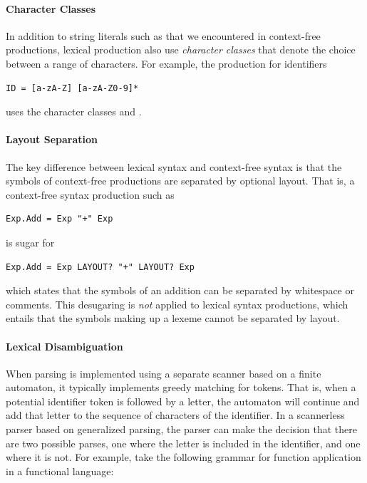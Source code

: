 \paragraph{Character Classes}

In addition to string literals such as  that we encountered in
context-free productions, lexical production also use \emph{character classes}
that denote the choice between a range of characters. For example, the
production for identifiers

\begin{lstlisting}[language=SDF]
ID = [a-zA-Z] [a-zA-Z0-9]* 
\end{lstlisting}

uses the character classes \sdfcode{[a-zA-Z]} and \sdfcode{[a-zA-Z0-9]}.

\paragraph{Layout Separation}

The key difference between lexical syntax and context-free syntax is that the
symbols of context-free productions are separated by optional layout. That is, a
context-free syntax production such as

\begin{lstlisting}[language=SDF]
Exp.Add = Exp "+" Exp 
\end{lstlisting}

is sugar for

\begin{lstlisting}[language=SDF]
Exp.Add = Exp LAYOUT? "+" LAYOUT? Exp 
\end{lstlisting}

which states that the symbols of an addition can be separated by whitespace or
comments. This desugaring is \emph{not} applied to lexical syntax productions,
which entails that the symbols making up a lexeme cannot be separated by layout.

\paragraph{Lexical Disambiguation}

When parsing is implemented using a separate scanner based on a finite
automaton, it typically implements greedy matching for tokens. That is, when a
potential identifier token is followed by a letter, the automaton will continue
and add that letter to the sequence of characters of the identifier. In a
scannerless parser based on generalized parsing, the parser can make the
decision that there are two possible parses, one where the letter is included
in the identifier, and one where it is not. For example, take the following
grammar for function application in a functional language:

